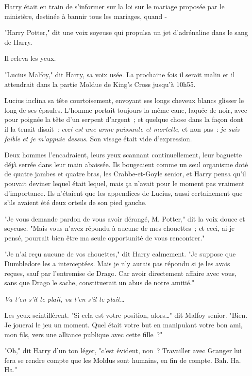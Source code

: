 Harry était en train de s'informer sur la loi sur le mariage proposée par le ministère, destinée à bannir tous les mariages, quand -

"Harry Potter," dit une voix soyeuse qui propulsa un jet d'adrénaline dans le sang de Harry.

Il releva les yeux.

"Lucius Malfoy," dit Harry, sa voix usée. La prochaine fois il serait malin et il attendrait dans la partie Moldue de King's Cross jusqu'à 10h55.

Lucius inclina sa tête courtoisement, envoyant ses longs cheveux blancs glisser le long de ses épaules. L'homme portait toujours la même cane, laquée de noir, avec pour poignée la tête d'un serpent d'argent~; et quelque chose dans la façon dont il la tenait disait~: \emph{ceci est une arme puissante et mortelle}, et non pas~: \emph{je suis faible et je m'appuie dessus}. Son visage était vide d'expression.

Deux hommes l'encadraient, leurs yeux scannant continuellement, leur baguette déjà serrée dans leur main abaissée. Ils bougeaient comme un seul organisme doté de quatre jambes et quatre bras, les Crabbe-et-Goyle senior, et Harry pensa qu'il pouvait deviner lequel était lequel, mais ça n'avait pour le moment pas vraiment d'importance. Ils n'étaient que les appendices de Lucius, aussi certainement que s'ils avaient été deux orteils de son pied gauche.

"Je vous demande pardon de vous avoir dérangé, M. Potter," dit la voix douce et soyeuse. "Mais vous n'avez répondu à aucune de mes chouettes~; et ceci, ai-je pensé, pourrait bien être ma seule opportunité de vous rencontrer."

"Je n'ai reçu aucune de vos chouettes," dit Harry calmement. "Je suppose que Dumbledore les a interceptées. Mais je n'y aurais pas répondu si je les avais reçues, sauf par l'entremise de Drago. Car avoir directement affaire avec vous, sans que Drago le sache, constituerait un abus de notre amitié."

\emph{Va-t'en s'il te plaît, va-t'en s'il te plaît…}

Les yeux scintillèrent. "Si cela est votre position, alors…" dit Malfoy senior. "Bien. Je jouerai le jeu un moment. Quel était votre but en manipulant votre bon ami, mon fils, vers une alliance publique avec cette fille~?"

"Oh," dit Harry d'un ton léger, "c'est évident, non~? Travailler avec Granger lui fera se rendre compte que les Moldus sont humains, en fin de compte. Bah. Ha. Ha."

